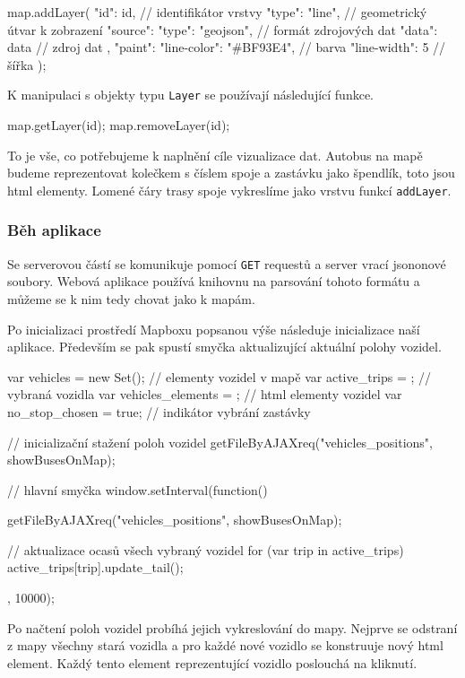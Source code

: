 \begin{code}[frame=none]
map.addLayer({
  "id": id, // identifikátor vrstvy
  "type": "line", // geometrický útvar k zobrazení
  "source": {
    "type": "geojson", // formát zdrojových dat
    "data": data // zdroj dat
  },
  "paint": {
    "line-color": "#BF93E4", // barva
    "line-width": 5 // šířka
  }
});
\end{code}


K manipulaci s objekty typu \verb-Layer- se používají následující funkce.


\begin{code}[frame=none]
map.getLayer(id);
map.removeLayer(id);
\end{code}


To je vše, co potřebujeme k naplnění cíle vizualizace dat. Autobus na mapě budeme reprezentovat kolečkem s číslem spoje a zastávku jako špendlík, toto jsou \gls{html} elementy. Lomené čáry trasy spoje vykreslíme jako vrstvu funkcí \verb-addLayer-.


\subsubsection{Běh aplikace}


Se serverovou částí se komunikuje pomocí \verb-GET- requestů a server vrací \gls{json}onové soubory. Webová aplikace používá knihovnu na parsování tohoto formátu a můžeme se k nim tedy chovat jako k mapám.


\bigbreak


Po inicializaci prostředí Mapboxu popsanou výše následuje inicializace naší aplikace. Především se pak spustí smyčka aktualizující aktuální polohy vozidel.


\begin{code}[frame=none]
var vehicles = new Set(); // elementy vozidel v mapě
var active_trips = {}; // vybraná vozidla
var vehicles_elements = {}; // html elementy vozidel
var no_stop_chosen = true; // indikátor vybrání zastávky


// inicializační stažení poloh vozidel
getFileByAJAXreq("vehicles_positions", showBusesOnMap);


// hlavní smyčka
window.setInterval(function(){
getFileByAJAXreq("vehicles_positions", showBusesOnMap);


// aktualizace ocasů všech vybraný vozidel
for (var trip in active_trips){
  active_trips[trip].update_tail();
}
}, 10000);
\end{code}


Po načtení poloh vozidel probíhá jejich vykreslování do mapy. Nejprve se odstraní z mapy všechny stará vozidla a pro každé nové vozidlo se konstruuje nový \gls{html} element. Každý tento element reprezentující vozidlo poslouchá na kliknutí.


